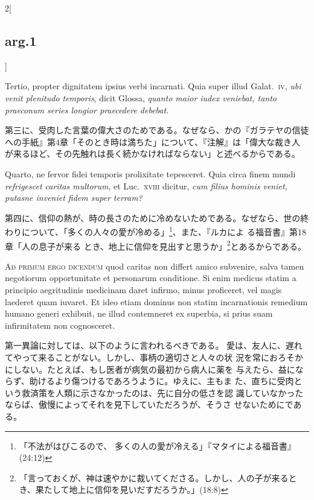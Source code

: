 \documentclass[paper=a4paper,fontsize=10pt,jafontsize=9pt,titlepage]{jlreq}
\begin{document}
\begin{paracol}{2}[\subsection{arg.1}]
\switchcolumn*

Tertio, propter
dignitatem ipsius verbi incarnati. Quia super illud Galat.~{\scshape iv}, {\itshape ubi venit
plenitudo temporis}, dicit Glossa, {\itshape quanto maior iudex veniebat, tanto
praeconum series longior praecedere debebat}.

\switchcolumn

第三に、受肉した言葉の偉大さのためである。なぜなら、かの『ガラテヤの信徒
 への手紙』第4章「そのとき時は満ちた」について、『注解』は「偉大な裁き人
 が来るほど、その先触れは長く続かなければならない」と述べるからである。

\switchcolumn*

Quarto, ne fervor fidei
temporis prolixitate tepesceret. Quia circa finem mundi {\itshape refrigescet
caritas multorum}, et Luc.~{\scshape xviii} dicitur, {\itshape cum filius hominis veniet,
putasne inveniet fidem super terram?}

\switchcolumn

第四に、信仰の熱が、時の長さのために冷めないためである。なぜなら、世の終
 わりについて、「多くの人々の愛が冷める」\footnote{「不法がはびこるので、
 多くの人の愛が冷える」『マタイによる福音書』(24:12)}、また、『ルカによ
 る福音書』第18章「人の息子が来る
 とき、地上に信仰を見出すと思うか」\footnote{「言っておくが、神は速やかに裁いてくださる。しかし、人の子が来るとき、果たして地上に信仰を見いだすだろうか。」(18:8)}とあるからである。

\switchcolumn*[\subsection{ad.1}]

{\scshape Ad primum ergo dicendum} quod caritas non
differt amico subvenire, salva tamen negotiorum opportunitate et
personarum conditione. Si enim medicus statim a principio aegritudinis
medicinam daret infirmo, minus proficeret, vel magis laederet quam
iuvaret. Et ideo etiam dominus non statim incarnationis remedium humano
generi exhibuit, ne illud contemneret ex superbia, si prius suam
infirmitatem non cognosceret.

\switchcolumn

第一異論に対しては、以下のように言われるべきである。
愛は、友人に、遅れてやって来ることがない。しかし、事柄の適切さと人々の状
 況を常におろそかにしない。たとえば、もし医者が病気の最初から病人に薬を
 与えたら、益にならず、助けるより傷つけるであろうように。ゆえに、主もま
 た、直ちに受肉という救済策を人類に示さなかったのは、先に自分の低さを認
 識していなかったならば、傲慢によってそれを見下していただろうが、そうさ
 せないためにである。


\end{paracol}
\end{document}

